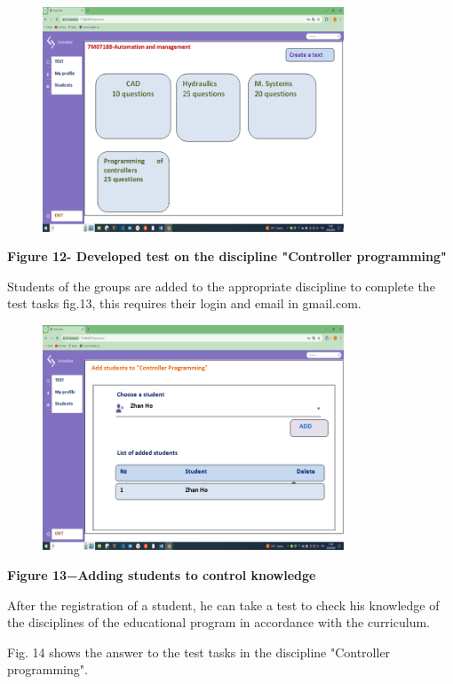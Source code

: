 \begin{figure}[H]
	\centering
	\includegraphics[width=0.8\textwidth]{assets/137}
	\caption*{}
\end{figure}

{\bfseries Figure 12- Developed test on the discipline "Controller
programming"}

Students of the groups are added to the appropriate discipline to
complete the test tasks fig.13, this requires their login and email in
gmail.com.

\begin{figure}[H]
	\centering
	\includegraphics[width=0.8\textwidth]{assets/138}
	\caption*{}
\end{figure}

{\bfseries Figure 13−Adding students to control knowledge}

After the registration of a student, he can take a test to check his
knowledge of the disciplines of the educational program in accordance
with the curriculum.

Fig. 14 shows the answer to the test tasks in the discipline "Controller
programming".


